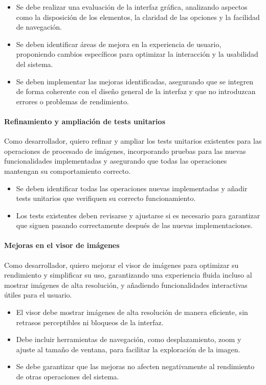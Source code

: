 \begin{itemize}[noitemsep]
	\item Se debe realizar una evaluación de la interfaz gráfica, analizando aspectos como la disposición de los elementos, la claridad de las opciones y la facilidad de navegación.
	\item Se deben identificar áreas de mejora en la experiencia de usuario, proponiendo cambios específicos para optimizar la interacción y la usabilidad del sistema.
	\item Se deben implementar las mejoras identificadas, asegurando que se integren de forma coherente con el diseño general de la interfaz y que no introduzcan errores o problemas de rendimiento.
\end{itemize}

\paragraph{Refinamiento y ampliación de tests unitarios} \label{hist:refinamiento_tests_unitarios}
Como desarrollador, quiero refinar y ampliar los tests unitarios existentes para las operaciones de procesado de imágenes, 
incorporando pruebas para las nuevas funcionalidades implementadas y asegurando que todas las operaciones mantengan 
su comportamiento correcto.

\begin{itemize}[noitemsep]
    \item Se deben identificar todas las operaciones nuevas implementadas y añadir tests unitarios que verifiquen su correcto funcionamiento.
    \item Los tests existentes deben revisarse y ajustarse si es necesario para garantizar que siguen pasando correctamente después de las nuevas implementaciones.
\end{itemize}

\newpage

\paragraph{Mejoras en el visor de imágenes} \label{hist:mejoras_visor_imagen}
Como desarrollador, quiero mejorar el visor de imágenes para optimizar su rendimiento y simplificar su uso, 
garantizando una experiencia fluida incluso al mostrar imágenes de alta resolución, y añadiendo funcionalidades 
interactivas útiles para el usuario.

\begin{itemize}[noitemsep]
    \item El visor debe mostrar imágenes de alta resolución de manera eficiente, sin retrasos perceptibles ni bloqueos de la interfaz.
    \item Debe incluir herramientas de navegación, como desplazamiento, zoom y ajuste al tamaño de ventana, para facilitar la exploración de la imagen.
    \item Se debe garantizar que las mejoras no afecten negativamente al rendimiento de otras operaciones del sistema.
\end{itemize}


